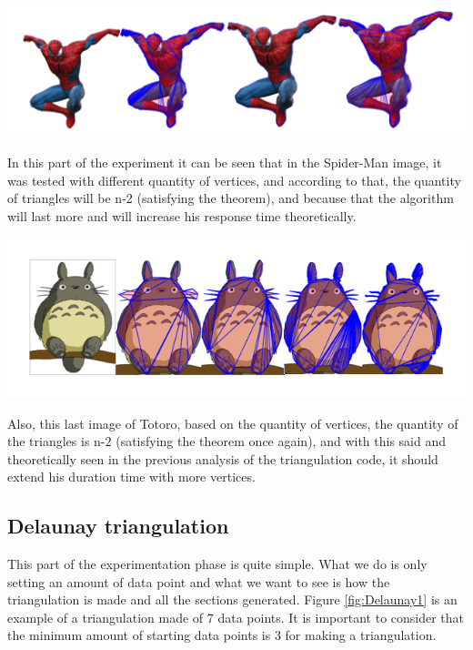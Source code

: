 \documentclass[conference]{IEEEtran}
\begin{document}
\includegraphics[scale=0.6]{spideyresults.png}

In this part of the experiment it can be seen that in the Spider-Man image, it was tested with different quantity of vertices, and according to that, the quantity of triangles will be n-2 (satisfying the theorem), and because that the algorithm will last more and will increase his response time theoretically.

\includegraphics[scale=0.53]{totoroResults.png}

Also, this last image of Totoro, based on the quantity of vertices, the quantity of the triangles is n-2 (satisfying the theorem once again), and with this said and theoretically seen in the previous analysis of the triangulation code, it should extend his duration time with more vertices.

\subsection{Delaunay triangulation}
This part of the experimentation phase is quite simple. What we do is only setting an amount of data point and what we want to see is how the triangulation is made and all the sections generated. Figure \ref{fig:Delaunay1} is an example of a triangulation made of 7 data points. It is important to consider that the minimum amount of starting data points is 3 for making a triangulation.
\end{document}
